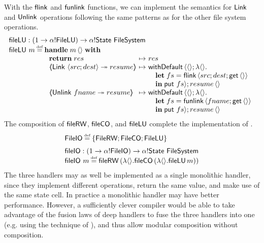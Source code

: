 \documentclass[12pt,phd,lfcs,twoside,openright,logo,leftchapter,normalheadings]{infthesis}
\theoremstyle{plain}
\theoremstyle{definition}
\begin{document}
With the $\mathsf{flink}$ and $\mathsf{funlink}$ functions, we can implement the
semantics for $\mathsf{Link}$ and $\mathsf{Unlink}$ operations following the same
patterns as for the other file system operations.
%
\[
  \bl
    \fileLU : (\UnitType \to \alpha \eff \FileLU) \to \alpha \eff \State~\FileSystem\\
    \fileLU~m \defas
       \bl
         \Handle\;m\,\Unit\;\With\\
             ~\ba{@{~}l@{~}c@{~}l}
                 \Return\;res      &\mapsto& res\\
                 \OpCase{\ULink}{\Record{src;dest}}{resume} &\mapsto&
                   \bl
                     \faild\,\Record{\Unit; \lambda\Unit.\\
                       \quad\bl
                         \Let\;fs = \flink\,\Record{src;dest;\Uget\,\Unit}\\
                         \In\;\Uput~fs}; resume\,\Unit
                       \el
                   \el\\
                 \OpCase{\UUnlink}{fname}{resume} &\mapsto&
                   \bl
                     \faild\,\Record{\Unit; \lambda\Unit.\\
                       \quad\bl
                         \Let\;fs = \funlink\,\Record{fname;\Uget\,\Unit}\\
                         \In\;\Uput~fs}; resume\,\Unit
                       \el
                   \el
               \ea
       \el
  \el
\]
%
The composition of $\mathsf{fileRW}$, $\mathsf{fileCO}$, and $\mathsf{fileLU}$ complete the
implementation of \fsname{}.
%
\[
  \bl
    \FileIO \defas \{\FileRW;\FileCO;\FileLU\} \medskip\\
    \fileIO : (\UnitType \to \alpha \eff \FileIO) \to \alpha \eff \State~\FileSystem \\
    \fileIO~m \defas \fileRW\,(\lambda\Unit. \fileAlloc\,(\lambda\Unit.\fileLU\,m))
  \el
\]
%
The three handlers may as well be implemented as a single monolithic
handler, since they implement different operations, return the same
value, and make use of the same state cell. In practice a monolithic
handler may have better performance. However, a sufficiently clever
compiler would be able to take advantage of the fusion laws of deep
handlers to fuse the three handlers into one (e.g. using the technique
of \citet{WuS15}), and thus allow modular composition without
composition.
\end{document}
